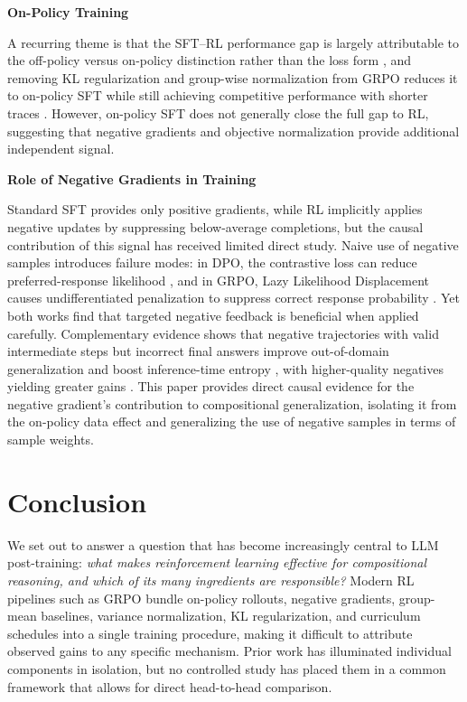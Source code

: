 \documentclass{article}
\begin{document}
\textbf{On-Policy Training}

A recurring theme is that the SFT–RL performance gap is largely attributable to the off-policy versus on-policy distinction rather than the loss form \citep{mingOneTokenRolloutGuiding2026}, and removing KL regularization and group-wise normalization from GRPO reduces it to on-policy SFT while still achieving competitive performance with shorter traces \citep{zhaoOnPolicySupervisedFineTuning2026}. However, on-policy SFT does not generally close the full gap to RL, suggesting that negative gradients and objective normalization provide additional independent signal.


\textbf{Role of Negative Gradients in Training}

Standard SFT provides only positive gradients, while RL implicitly applies negative updates by suppressing below-average completions, but the causal contribution of this signal has received limited direct study. Naive use of negative samples introduces failure modes: in DPO, the contrastive loss can reduce preferred-response likelihood \citep{pal_smaug_2024}, and in GRPO, Lazy Likelihood Displacement causes undifferentiated penalization to suppress correct response probability \citep{deng_effect_2025}. Yet both works find that targeted negative feedback is beneficial when applied carefully. Complementary evidence shows that negative trajectories with valid intermediate steps but incorrect final answers improve out-of-domain generalization and boost inference-time entropy \citep{tian_learning_2026}, with higher-quality negatives yielding greater gains \citep{di_not_2026}. This paper provides direct causal evidence for the negative gradient's contribution to compositional generalization, isolating it from the on-policy data effect and generalizing the use of negative samples in terms of sample weights.




\section{Conclusion}

We set out to answer a question that has become increasingly central to LLM post-training: \emph{what makes reinforcement learning effective for compositional reasoning, and which of its many ingredients are responsible?} Modern RL pipelines such as GRPO bundle on-policy rollouts, negative gradients, group-mean baselines, variance normalization, KL regularization, and curriculum schedules into a single training procedure, making it difficult to attribute observed gains to any specific mechanism. Prior work has illuminated individual components in isolation, but no controlled study has placed them in a common framework that allows for direct head-to-head comparison.
\end{document}
